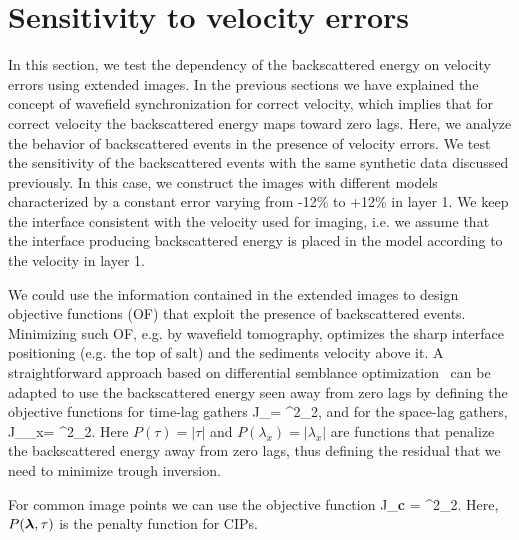 \section{Sensitivity to velocity errors}


In this section, we test the dependency of the backscattered energy on velocity errors using extended images. In the previous sections 
we have explained the concept of wavefield synchronization for correct velocity, which implies that for correct velocity the backscattered energy maps 
toward zero lags. Here, we analyze the behavior of backscattered events in the presence of velocity errors.
We test the sensitivity of the backscattered events with the same synthetic data discussed previously. In this case, we construct the images
with different models characterized by a constant error varying from -12\% to +12\% in layer 1. We keep the interface 
consistent with the velocity used for imaging, i.e. we assume that the interface producing backscattered energy is placed in the model
according to the velocity in layer 1.

We could use the information contained in the extended images to design objective functions (OF) that exploit the presence of backscattered events. 
Minimizing such OF, e.g. by wavefield tomography, optimizes the sharp interface positioning (e.g. the top of salt) and the sediments velocity above it.
A straightforward approach based on differential semblance optimization~\citep{shen:2132} can be adapted to use
 the backscattered energy seen away from zero lags by defining the objective functions for time-lag gathers
\beq
 J_{\tau}=  ^2_2,
\label{eq:of1}
\eeq 
and for the space-lag gathers,
\beq
 J_{\lambda_x}=  ^2_2.
\label{eq:of2}
\eeq 
%
Here $P(\tau)=|\tau|$ and $P(\lambda_x)=|\lambda_x|$ are functions that penalize the backscattered energy away 
from zero lags, thus defining the residual that we need to minimize trough inversion.

For common image points we can use the objective function
\beq
J_{\bf c} =   ^2_2.
\eeq
%
Here, $P({\boldsymbol{\lambda}},\tau)$ is the penalty function for CIPs.

